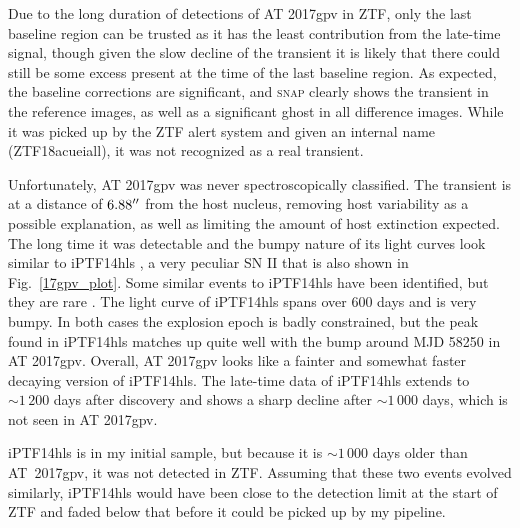 \documentclass[a4paper,oneside,12pt, class=Latex/Classes/PhDthesisPSnPDF, crop=false]{standalone}
\begin{document}
Due to the long duration of detections of AT 2017gpv in ZTF, only the last baseline region can be trusted as it has the least contribution from the late-time signal, though given the slow decline of the transient it is likely that there could still be some excess present at the time of the last baseline region. As expected, the baseline corrections are significant, and \textsc{snap} clearly shows the transient in the reference images, as well as a significant ghost in all difference images. While it was picked up by the ZTF alert system and given an internal name (ZTF18acueiall), it was not recognized as a real transient.

Unfortunately, AT 2017gpv was never spectroscopically classified. The transient is at a distance of $6.88^{\prime\prime}$ from the host nucleus, removing host variability as a possible explanation, as well as limiting the amount of host extinction expected. The long time it was detectable and the bumpy nature of its light curves look similar to iPTF14hls \citep{iPTF14hls_Iair, Sollerman_2019_iptf14hls}, a very peculiar SN II that is also shown in Fig.~\ref{17gpv_plot}. Some similar events to iPTF14hls have been identified, but they are rare \citep{Yang_2021_20faa, Soraisam_2022}. The light curve of iPTF14hls spans over 600 days and is very bumpy. In both cases the explosion epoch is badly constrained, but the peak found in iPTF14hls matches up quite well with the bump around MJD 58250 in AT 2017gpv. Overall, AT 2017gpv looks like a fainter and somewhat faster decaying version of iPTF14hls. The late-time data of iPTF14hls \citep{Sollerman_2019_iptf14hls} extends to $\sim1\,200$ days after discovery and shows a sharp decline after $\sim1\,000$ days, which is not seen in AT 2017gpv.

iPTF14hls is in my initial sample, but because it is $\sim1\,000$ days older than AT~2017gpv, it was not detected in ZTF. Assuming that these two events evolved similarly, iPTF14hls would have been close to the detection limit at the start of ZTF and faded below that before it could be picked up by my pipeline.
\end{document}
